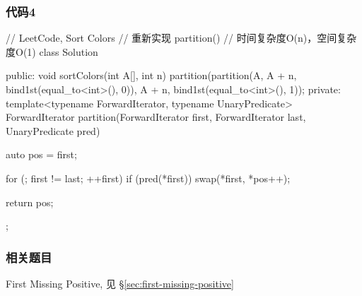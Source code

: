 \subsubsection{代码4}
\begin{Code}
	// LeetCode, Sort Colors
	// 重新实现 partition()
	// 时间复杂度O(n)，空间复杂度O(1)
	class Solution {
		public:
		void sortColors(int A[], int n) {
			partition(partition(A, A + n, bind1st(equal_to<int>(), 0)), A + n,
			bind1st(equal_to<int>(), 1));
		}
		private:
		template<typename ForwardIterator, typename UnaryPredicate>
		ForwardIterator partition(ForwardIterator first, ForwardIterator last,
		UnaryPredicate pred) {
			auto pos = first;
			
			for (; first != last; ++first)
			if (pred(*first))
			swap(*first, *pos++);
			
			return pos;
		}
	};
\end{Code}


\subsubsection{相关题目}
\begindot
\item First Missing Positive, 见 \S \ref{sec:first-missing-positive}
\myenddot
